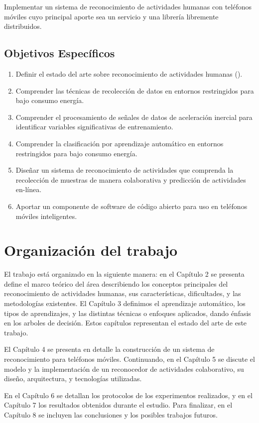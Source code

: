 \label{objetivo-general}

Implementar un sistema de reconocimiento de actividades humanas con
teléfonos móviles cuyo principal aporte sea un servicio y una librería
libremente distribuidos.

\subsection{Objetivos Específicos}

\label{objetivos-especuxedficos}
\begin{enumerate}
\item \label{enu:obe1}Definir el estado del arte sobre reconocimiento de
actividades humanas (). 
\item \label{enu:obe2}Comprender las técnicas de recolección de datos en
entornos restringidos para bajo consumo energía. 
\item \label{enu:obe3}Comprender el procesamiento de señales de datos de
aceleración inercial para identificar variables significativas de
entrenamiento. 
\item \label{enu:obe4}Comprender la clasificación por aprendizaje automático
en entornos restringidos para bajo consumo energía. 
\item \label{enu:obe5}Diseñar un sistema de reconocimiento de actividades
que comprenda la recolección de muestras de manera colaborativa y
predicción de actividades en-línea. 
\item \label{enu:obe6}Aportar un componente de software de código abierto
para uso en teléfonos móviles inteligentes. 
\end{enumerate}

\section{Organización del trabajo}

\label{organizaciuxf3n-del-trabajo}

El trabajo está organizado en la siguiente manera: en el Capítulo
2 se presenta define el marco teórico del área describiendo los conceptos
principales del reconocimiento de actividades humanas, sus características,
dificultades, y las metodologías existentes. El Capítulo 3 definimos
el aprendizaje automático, los tipos de aprendizajes, y las distintas
técnicas o enfoques aplicados, dando énfasis en los arboles de decisión.
Estos capítulos representan el estado del arte de este trabajo.

El Capítulo 4 se presenta en detalle la construcción de un sistema
de reconocimiento para teléfonos móviles. Continuando, en el Capítulo
5 se discute el modelo y la implementación de un reconocedor de actividades
colaborativo, su diseño, arquitectura, y tecnologías utilizadas.

En el Capítulo 6 se detallan los protocolos de los experimentos realizados,
y en el Capítulo 7 los resultados obtenidos durante el estudio. Para
finalizar, en el Capítulo 8 se incluyen las conclusiones y los posibles
trabajos futuros. 
